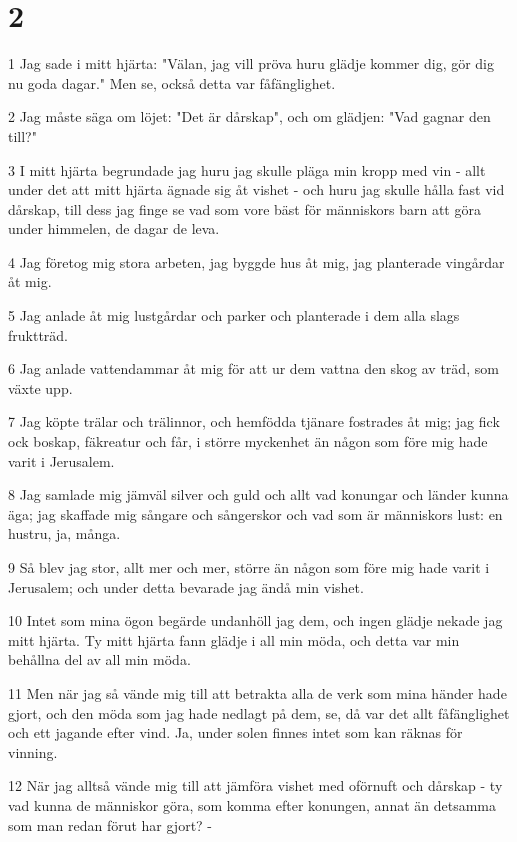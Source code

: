 \chapter{2}

\par 1 Jag sade i mitt hjärta: "Välan, jag vill pröva huru glädje kommer dig, gör dig nu goda dagar." Men se, också detta var fåfänglighet.
\par 2 Jag måste säga om löjet: "Det är dårskap", och om glädjen: "Vad gagnar den till?"
\par 3 I mitt hjärta begrundade jag huru jag skulle pläga min kropp med vin - allt under det att mitt hjärta ägnade sig åt vishet - och huru jag skulle hålla fast vid dårskap, till dess jag finge se vad som vore bäst för människors barn att göra under himmelen, de dagar de leva.
\par 4 Jag företog mig stora arbeten, jag byggde hus åt mig, jag planterade vingårdar åt mig.
\par 5 Jag anlade åt mig lustgårdar och parker och planterade i dem alla slags fruktträd.
\par 6 Jag anlade vattendammar åt mig för att ur dem vattna den skog av träd, som växte upp.
\par 7 Jag köpte trälar och trälinnor, och hemfödda tjänare fostrades åt mig; jag fick ock boskap, fäkreatur och får, i större myckenhet än någon som före mig hade varit i Jerusalem.
\par 8 Jag samlade mig jämväl silver och guld och allt vad konungar och länder kunna äga; jag skaffade mig sångare och sångerskor och vad som är människors lust: en hustru, ja, många.
\par 9 Så blev jag stor, allt mer och mer, större än någon som före mig hade varit i Jerusalem; och under detta bevarade jag ändå min vishet.
\par 10 Intet som mina ögon begärde undanhöll jag dem, och ingen glädje nekade jag mitt hjärta. Ty mitt hjärta fann glädje i all min möda, och detta var min behållna del av all min möda.
\par 11 Men när jag så vände mig till att betrakta alla de verk som mina händer hade gjort, och den möda som jag hade nedlagt på dem, se, då var det allt fåfänglighet och ett jagande efter vind. Ja, under solen finnes intet som kan räknas för vinning.
\par 12 När jag alltså vände mig till att jämföra vishet med oförnuft och dårskap - ty vad kunna de människor göra, som komma efter konungen, annat än detsamma som man redan förut har gjort? -
